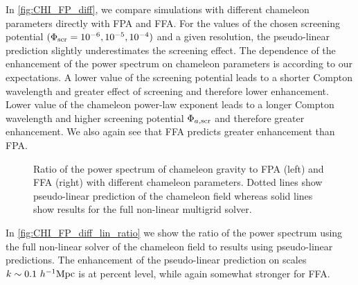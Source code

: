 In \autoref{fig:CHI_FP_diff}, we compare simulations with different chameleon parameters directly with FPA and FFA. For the values of the chosen screening potential $(\Phi_{\text{\scriptsize scr}}=10^{-6}, 10^{-5}, 10^{-4})$ and a given resolution, the pseudo-linear prediction slightly underestimates the screening effect. The dependence of the enhancement of the power spectrum on chameleon parameters is according to our expectations. A lower value of the screening potential leads to a shorter Compton wavelength and greater effect of screening and therefore lower enhancement. Lower value of the chameleon power-law exponent leads to a longer Compton wavelength and higher screening potential $\Phi_{a,\text{\scriptsize scr}}$ and therefore greater enhancement. We also again see that FFA predicts greater enhancement than FPA.

\begin{figure*}
  \centering
  \chileft
	\begin{subfigure}{1.2\textwidth}
	\end{subfigure}
	\begin{subfigure}{0.5\textwidth}
	\end{subfigure}%
	\begin{subfigure}{0.5\textwidth}
	\end{subfigure}
  \caption{Ratio of the power spectrum of chameleon gravity to FPA (left) and FFA (right) with different chameleon parameters. Dotted lines show pseudo-linear prediction of the chameleon field whereas solid lines show results for the full non-linear multigrid solver.}
  \label{fig:CHI_FP_diff}
\end{figure*}

In \autoref{fig:CHI_FP_diff_lin_ratio} we show the ratio of the power spectrum using the full non-linear solver of the chameleon field to results using pseudo-linear predictions. The enhancement of the pseudo-linear prediction on scales $k\sim0.1~h^{-1}\text{Mpc}$ is at percent level, while again somewhat stronger for FFA.

